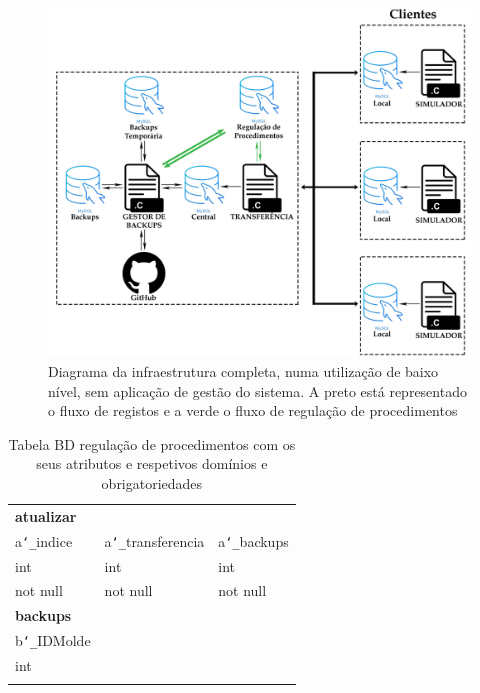 \documentclass[11pt,twoside,a4paper]{report}
\begin{document}
\begin{figure}[H]
	\begin{center}
		\includegraphics[width=1\textwidth]{Esquema_Projeto_Total01} %
		\caption[Diagrama da infraestrutura completa sem aplicação de gestão do sistema]{Diagrama da infraestrutura completa, numa utilização de baixo nível, sem aplicação de gestão do sistema. A preto está representado o fluxo de registos e a verde o fluxo de regulação de procedimentos}
		\label{fig:infra_total1}
	\end{center}
\end{figure}
\newpage
\begin{table}
	\centering
	\begin{tabular}{|l|l|l|}
		\multicolumn{3}{l}{\textbf{atualizar}}\\ \cline{1-3}
		a\texttt{\char`_}indice & a\texttt{\char`_}transferencia & a\texttt{\char`_}backups\\ \cline{1-3}
		int & int & int\\ \cline{1-3}
		not null & not null & not null\\ \cline{1-3}
		\multicolumn{3}{l}{\textbf{backups}}\\ \cline{1-1}
		b\texttt{\char`_}IDMolde &\multicolumn{2}{l}{}\\ \cline{1-1}
		int &\multicolumn{1}{l}{}\\ \cline{1-1}
		 &\multicolumn{2}{l}{}\\ \cline{1-1}
	\end{tabular}
	\caption[Tabelas da base de dados regulação de procedimentos com os seus atributos e respetivos domínios e obrigatoriedades]{Tabela BD regulação de procedimentos com os seus atributos e respetivos domínios e obrigatoriedades}
	\label{tab:notificacoes}
\end{table}
\end{document}
